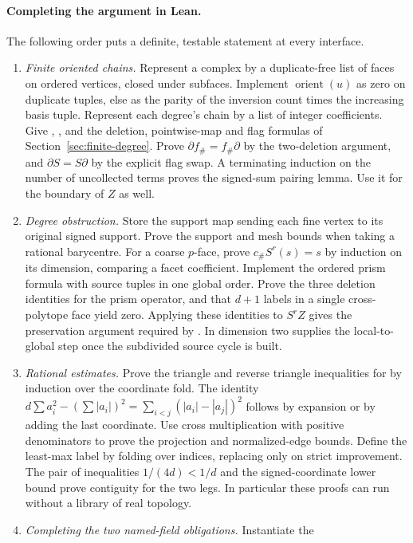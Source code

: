 \paragraph{Completing the argument in Lean.}
The following order puts a definite, testable statement at every interface.
\begin{enumerate}
\item \emph{Finite oriented chains.} Represent a complex by a duplicate-free
list of faces on ordered vertices, closed under subfaces. Implement
$\operatorname{orient}(u)$ as zero on duplicate tuples, else as the
parity of the inversion count times the increasing basis tuple.
Represent each degree's chain by a list of integer coefficients. Give
, , and  the deletion,
pointwise-map and flag formulas of Section~\ref{sec:finite-degree}.
Prove $\partial f_\#=f_\#\partial$ by the two-deletion argument, and
$\partial S=S\partial$ by the explicit flag swap. A terminating
induction on the number of uncollected terms proves the signed-sum
pairing lemma. Use it for the boundary of $Z$ as well.
\item \emph{Degree obstruction.} Store the support map sending each fine
vertex to its original signed support. Prove the support and mesh bounds
when taking a rational barycentre. For a coarse $p$-face, prove
$c_\# S^r(s)=s$ by induction on its dimension, comparing a facet
coefficient. Implement the ordered prism formula with source tuples in
one global order. Prove the three deletion identities for the prism
operator, and that $d+1$ labels in a single cross-polytope face yield
zero. Applying these identities to $S^rZ$ gives the preservation
argument required by . In dimension two
 supplies the local-to-global step once the
subdivided source cycle is built.
\item \emph{Rational estimates.} Prove the triangle and reverse triangle
inequalities for  by induction over the coordinate fold.
The identity $d\sum a_i^2-(\sum |a_i|)^2=\sum_{i<j}(|a_i|-|a_j|)^2$
follows by expansion or by adding the last coordinate. Use
cross multiplication with positive denominators to prove the projection
and normalized-edge bounds. Define the least-max label by folding over
indices, replacing only on strict improvement. The pair of inequalities
$1/(4d)<1/d$ and the signed-coordinate lower bound prove contiguity for
the two legs. In particular these proofs can run without a library of
real topology.
\item \emph{Completing the two named-field obligations.} Instantiate the

\end{enumerate}
